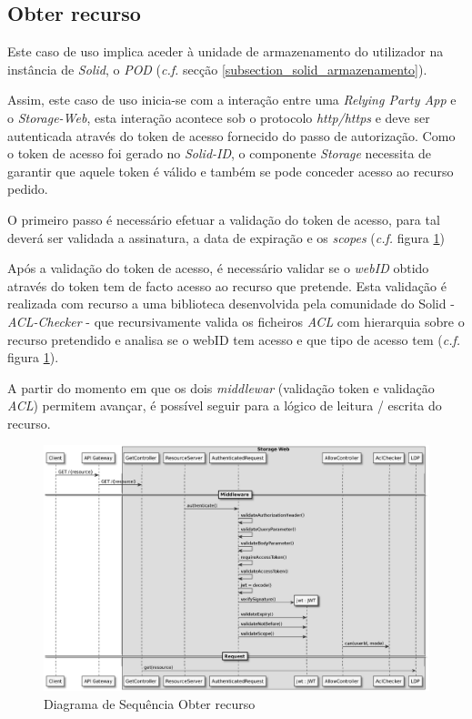 \subsection{Obter recurso}
Este caso de uso implica aceder à unidade de armazenamento do utilizador na instância de \emph{Solid}, o \emph{\acrshort{POD}} (\emph{c.f.} secção \ref{subsection_solid_armazenamento}). 

Assim, este caso de uso inicia-se com a interação entre uma \emph{Relying Party App} e o \emph{Storage-Web}, esta interação acontece sob o protocolo \emph{http/https} e deve ser autenticada através do token de acesso fornecido do passo de autorização.
Como o token de acesso foi gerado no \emph{Solid-ID}, o componente \emph{Storage} necessita de garantir que aquele token é válido e também se pode conceder acesso ao recurso pedido.

O primeiro passo é necessário efetuar a validação do token de acesso, para tal deverá ser validada a assinatura, a data de expiração e os \emph{scopes} (\emph{c.f.} figura \ref{retrieve_resource_sd})

Após a validação do token de acesso, é necessário validar se o \emph{webID} obtido através do token tem de facto acesso ao recurso que pretende. Esta validação é realizada com recurso a uma biblioteca desenvolvida pela comunidade do Solid - \emph{ACL-Checker} - que recursivamente valida os ficheiros \emph{\acrshort{ACL}} com hierarquia sobre o recurso pretendido e analisa se o webID tem acesso e que tipo de acesso tem (\emph{c.f.} figura \ref{retrieve_resource_sd}).

A partir do momento em que os dois \emph{middlewar} (validação token e validação \emph{\acrshort{ACL}}) permitem avançar, é possível seguir para a lógico de leitura / escrita do recurso.

\begin{figure}[H]
    \begin{center}
    \includegraphics[width=1 \textwidth]{figures/retrieve_resource_sd_complete.eps}
    \caption{Diagrama de Sequência Obter recurso}
            \label{retrieve_resource_sd}
    \end{center}
\end{figure}












